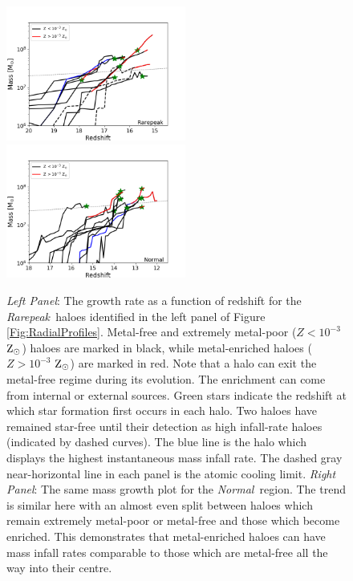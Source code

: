 \documentclass[graphics, twocolumn, usenatbib]{mn2e}
\newcommand{\zsolarc} {$\rm{Z_{\odot}}$}
\newcommand{\rarepeak} {\textit{Rarepeak~}}
\newcommand{\normal} {\textit{Normal~}}
\begin{document}
\begin{figure} 
\centering
\begin{minipage}{175mm}      \begin{center} 
\centerline{
\includegraphics[width=0.525\textwidth]{FIGURES/Rarepeak_MassRedshift.png}
\includegraphics[width=0.525\textwidth]{FIGURES/Normal_MassRedshift.png}}
\caption{\textit{Left Panel}: The growth rate as a function of redshift for the \rarepeak haloes
  identified in the left
  panel of Figure \ref{Fig:RadialProfiles}. Metal-free and extremely metal-poor ($Z < 10^{-3}$
  \zsolarc) haloes are marked in black, while metal-enriched haloes ($Z > 10^{-3}$ \zsolarc) are
  marked in red. Note that a halo can exit the metal-free regime during its evolution. The
  enrichment can come from internal or external sources. Green stars indicate the redshift at
  which star formation first occurs in each halo. Two haloes have remained star-free until their
  detection as high infall-rate haloes (indicated by dashed curves). The blue line is the halo which displays the
  highest instantaneous mass infall rate. 
  The dashed gray near-horizontal line in each panel is the atomic cooling limit.
  \textit{Right Panel}: The same mass growth plot for the \normal region. The trend is similar
  here with an almost even split between haloes which remain extremely metal-poor or metal-free and
  those which become enriched. This demonstrates that metal-enriched haloes can have
  mass infall rates comparable to those which are metal-free all the way into their centre. 
}\label{Fig:GrowthRates}
\end{center} \end{minipage}

\end{figure}
\end{document}
